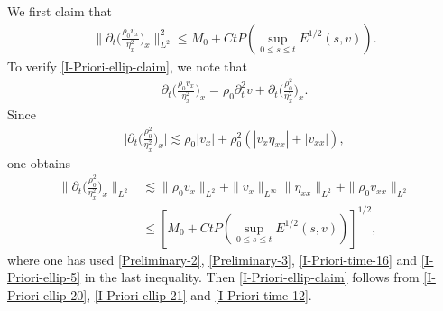 \documentclass[11pt, reqno]{amsart}
\numberwithin{equation}{section}
\begin{document}
\bigskip
{} We first claim that
\begin{equation}\label{I-Priori-ellip-claim}
\begin{aligned}
\bigg\|\partial_t\bigg(\frac{\rho_0v_x}{\eta_x^2}\bigg)_x\bigg\|_{L^2}^2
\leq M_0+Ct P(\sup_{0\leq s\leq t}E^{1/2}(s,v)).
\end{aligned}
\end{equation}
To verify \eqref{I-Priori-ellip-claim}, we note that
\begin{equation}\label{I-Priori-ellip-20}
\begin{aligned}
\partial_t\bigg(\frac{\rho_0v_x}{\eta_x^2}\bigg)_x=\rho_0\partial_t^2v
+\partial_t\bigg(\frac{\rho_0^2}{\eta_x^2}\bigg)_x.
\end{aligned}
\end{equation}
Since
\begin{equation*}
\begin{aligned}
\bigg|\partial_t\bigg({\frac{\rho_0^2}{\eta_x^2}}\bigg)_x\bigg|
\lesssim \rho_0|v_x|+\rho_0^2(|v_x\eta_{xx}|+|v_{xx}|),
\end{aligned}
\end{equation*}
one obtains
\begin{equation}\label{I-Priori-ellip-21}
\begin{aligned}
\bigg\|\partial_t\bigg({\frac{\rho_0^2}{\eta_x^2}}\bigg)_x\bigg\|_{L^2}
&\lesssim \|\rho_0v_x\|_{L^2}+\|v_x\|_{L^\infty}\|\eta_{xx}\|_{L^2}+\|\rho_0v_{xx}\|_{L^2}\\
&\leq [M_0+Ct P(\sup_{0\leq s\leq t}E^{1/2}(s,v))]^{1/2},
\end{aligned}
\end{equation}
where one has used \eqref{Preliminary-2}, \eqref{Preliminary-3}, \eqref{I-Priori-time-16} and \eqref{I-Priori-ellip-5} in the last inequality. Then \eqref{I-Priori-ellip-claim} follows from \eqref{I-Priori-ellip-20}, \eqref{I-Priori-ellip-21} and \eqref{I-Priori-time-12}.
\end{document}
